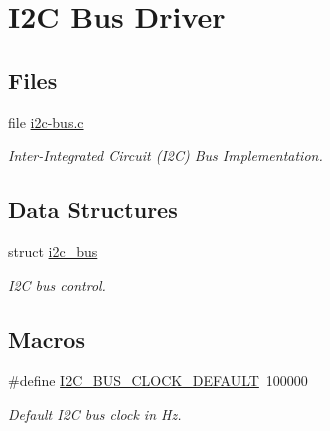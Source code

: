 \hypertarget{group__I2CBus}{}\section{I2C Bus Driver}
\label{group__I2CBus}
\subsection*{Files}
\begin{DoxyCompactItemize}
\item 
file \mbox{\hyperlink{i2c-bus_8c}{i2c-\/bus.\+c}}
\begin{DoxyCompactList}\small\item\em Inter-\/\+Integrated Circuit (I2C) Bus Implementation. \end{DoxyCompactList}\end{DoxyCompactItemize}
\subsection*{Data Structures}
\begin{DoxyCompactItemize}
\item 
struct \mbox{\hyperlink{structi2c__bus}{i2c\+\_\+bus}}
\begin{DoxyCompactList}\small\item\em I2C bus control. \end{DoxyCompactList}\end{DoxyCompactItemize}
\subsection*{Macros}
\begin{DoxyCompactItemize}
\item 
\mbox{\label{group__I2CBus_ga8926381d74682fc32fee4727c8d76cac}} 
\#define \mbox{\hyperlink{group__I2CBus_ga8926381d74682fc32fee4727c8d76cac}{I2\+C\+\_\+\+B\+U\+S\+\_\+\+C\+L\+O\+C\+K\+\_\+\+D\+E\+F\+A\+U\+LT}}~100000
\begin{DoxyCompactList}\small\item\em Default I2C bus clock in Hz. \end{DoxyCompactList}\end{DoxyCompactItemize}
